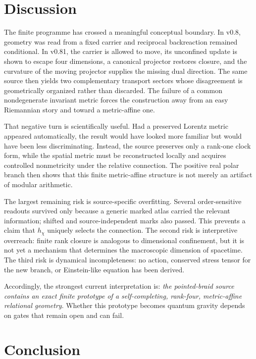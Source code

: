 \documentclass[12pt,a4paper,twoside]{article}
\begin{document}
\section{Discussion}

The finite programme has crossed a meaningful conceptual boundary. In v0.8, geometry was read from a fixed carrier and reciprocal backreaction remained conditional. In v0.81, the carrier is allowed to move, its unconfined update is shown to escape four dimensions, a canonical projector restores closure, and the curvature of the moving projector supplies the missing dual direction. The same source then yields two complementary transport sectors whose disagreement is geometrically organized rather than discarded. The failure of a common nondegenerate invariant metric forces the construction away from an easy Riemannian story and toward a metric-affine one.

That negative turn is scientifically useful. Had a preserved Lorentz metric appeared automatically, the result would have looked more familiar but would have been less discriminating. Instead, the source preserves only a rank-one clock form, while the spatial metric must be reconstructed locally and acquires controlled nonmetricity under the relative connection. The positive real polar branch then shows that this finite metric-affine structure is not merely an artifact of modular arithmetic.

The largest remaining risk is source-specific overfitting. Several order-sensitive readouts survived only because a generic marked atlas carried the relevant information; shifted and source-independent marks also passed. This prevents a claim that $h_\chi$ uniquely selects the connection. The second risk is interpretive overreach: finite rank closure is analogous to dimensional confinement, but it is not yet a mechanism that determines the macroscopic dimension of spacetime. The third risk is dynamical incompleteness: no action, conserved stress tensor for the new branch, or Einstein-like equation has been derived.

Accordingly, the strongest current interpretation is: \emph{the pointed-braid source contains an exact finite prototype of a self-completing, rank-four, metric-affine relational geometry}. Whether this prototype becomes quantum gravity depends on gates that remain open and can fail.

\section{Conclusion}
\end{document}
